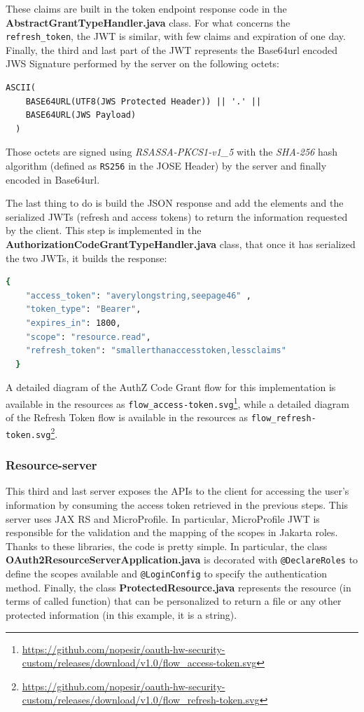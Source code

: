 \noindent These claims are built in the token endpoint response code in the \textbf{AbstractGrantTypeHandler.java} class. For what concerns the \texttt{refresh\_token}, the JWT is similar, with few claims and expiration of one day.
Finally, the third and last part of the JWT represents the Base64url encoded JWS Signature performed by the server on the following octets:
\begin{lstlisting}[basicstyle=\ttfamily]
  ASCII(
    BASE64URL(UTF8(JWS Protected Header)) || '.' ||
    BASE64URL(JWS Payload)
  )
\end{lstlisting}

\noindent Those octets are signed using \textit{RSASSA-PKCS1-v1\_5} with the \textit{SHA-256} hash algorithm (defined as \texttt{RS256} in the JOSE Header) by the server and finally encoded in Base64url.

The last thing to do is build the JSON response and add the elements and the serialized JWTs (refresh and access tokens) to return the information requested by the client. This step is implemented in the \textbf{AuthorizationCodeGrantTypeHandler.java} class, that once it has serialized the two JWTs, it builds the response:

\begin{lstlisting}[language=bash, basicstyle=\ttfamily]
  {
    "access_token": "averylongstring,seepage46" ,
    "token_type": "Bearer",  
    "expires_in": 1800,
    "scope": "resource.read",
    "refresh_token": "smallerthanaccesstoken,lessclaims"
  }
\end{lstlisting}

A detailed diagram of the AuthZ Code Grant flow for this implementation is available in the resources as \texttt{flow\_access-token.svg}\footnote{\url{https://github.com/nopesir/oauth-hw-security-custom/releases/download/v1.0/flow_access-token.svg}}, while a detailed diagram of the Refresh Token flow is available in the resources as \texttt{flow\_refresh-token.svg}\footnote{\url{https://github.com/nopesir/oauth-hw-security-custom/releases/download/v1.0/flow_refresh-token.svg}}.

\subsubsection{Resource-server}
This third and last server exposes the APIs to the client for accessing the user's information by consuming the access token retrieved in the previous steps. This server uses JAX RS and MicroProfile. In particular, MicroProfile JWT is responsible for the validation and the mapping of the scopes in Jakarta roles. Thanks to these libraries, the code is pretty simple. In particular, the class \textbf{OAuth2ResourceServerApplication.java} is decorated with \texttt{@DeclareRoles} to define the scopes available and \texttt{@LoginConfig} to specify the authentication method. Finally, the class \textbf{ProtectedResource.java} represents the resource (in terms of called function) that can be personalized to return a file or any other protected information (in this example, it is a string).

